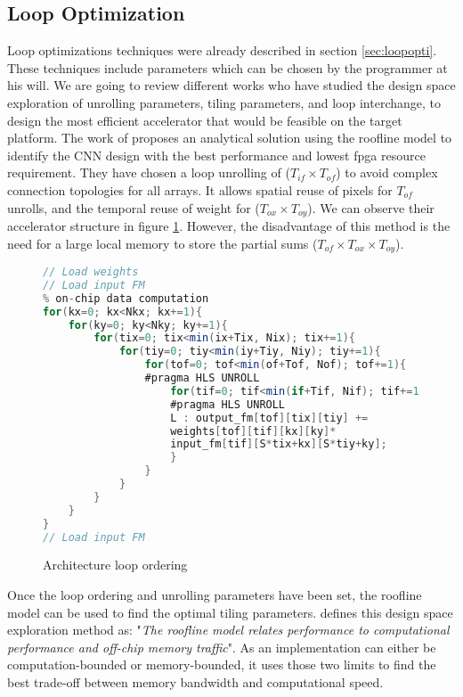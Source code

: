 \subsection{Loop Optimization} \label{subsec:loopopti}
%
%
Loop optimizations techniques were already described in section \ref{sec:loopopti}. These techniques include parameters which can be chosen by the programmer at his will. We are going to review different works who have studied the design space exploration of unrolling parameters, tiling parameters, and loop interchange, to design the most efficient accelerator that would be feasible on the target platform. \newline \newline
%
The work of \cite{zhang_optimizing_2015} proposes an analytical solution using the roofline model \cite{williams_roofline_2009} to identify the CNN design with the best performance and lowest \acrshort{fpga} resource requirement. They have chosen a loop unrolling of ($T_{if} \times T_{of}$) to avoid complex connection topologies for all arrays. It allows spatial reuse of pixels for $T_{of}$ unrolls, and the temporal reuse of weight for ($T_{ox} \times T_{oy}$). We can observe their accelerator structure in figure \ref{lst:accelerator}. However, the disadvantage of this method is the need for a large local memory to store the partial sums ($T_{of} \times T_{ox} \times T_{oy}$).
%
\begin{figure}
    \centering
    \begin{lstlisting}[language=Java]
// Load weights
// Load input FM
% on-chip data computation
for(kx=0; kx<Nkx; kx+=1){
    for(ky=0; ky<Nky; ky+=1){
        for(tix=0; tix<min(ix+Tix, Nix); tix+=1){
            for(tiy=0; tiy<min(iy+Tiy, Niy); tiy+=1){
                for(tof=0; tof<min(of+Tof, Nof); tof+=1){
                #pragma HLS UNROLL
                    for(tif=0; tif<min(if+Tif, Nif); tif+=1){
                    #pragma HLS UNROLL
                    L : output_fm[tof][tix][tiy] +=
                    weights[tof][tif][kx][ky]*
                    input_fm[tif][S*tix+kx][S*tiy+ky];
                    }
                }
            }
        }
    }
}
// Load input FM
    \end{lstlisting}
    \caption{Architecture loop ordering \cite{zhang_optimizing_2015}}
    \label{lst:accelerator}
\end{figure} \newline
%
Once the loop ordering and unrolling parameters have been set, the roofline model can be used to find the optimal tiling parameters. \textcite{mittal_survey_2020} defines this design space exploration method as: "\textit{The roofline model relates performance to computational performance and off-chip memory traffic}". As an implementation can either be computation-bounded or memory-bounded, it uses those two limits to find the best trade-off between memory bandwidth and computational speed.
